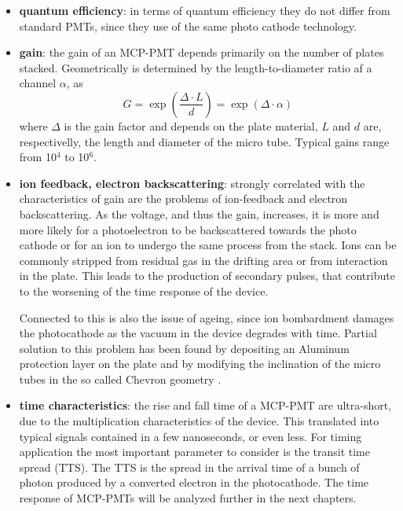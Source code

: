 \begin{itemize}
\item \textbf{quantum efficiency}: in terms of quantum efficiency they do not differ from standard PMTs, since they use of the same photo cathode technology.
\item \textbf{gain}: the gain of an MCP-PMT depends primarily on the number of plates stacked. Geometrically is determined by the length-to-diameter ratio af a channel $\alpha$, as
\begin{equation}
G = \exp{\left( \frac{\Delta \cdot L}{d} \right)} = \exp{\left( \Delta \cdot \alpha \right)}
\end{equation}
where $\Delta$ is the gain factor and depends on the plate material, $L$ and $d$ are, respectivelly, the length and diameter of the micro tube.
Typical gains range from 10$^{4}$ to 10$^{6}$.
\item \textbf{ion feedback, electron backscattering}: strongly correlated with the characteristics of gain are the problems of ion-feedback and electron backscattering. As the voltage, and thus the gain, increases, it is more and more likely for a photoelectron to be backscattered towards the photo cathode or for an ion to undergo the same process from the stack. Ions can be commonly stripped from residual gas in the drifting area or from interaction in the plate.
This leads to the production of secondary pulses, that contribute to the worsening of the time response of the device.

Connected to this is also the issue of ageing, since ion bombardment damages the photocathode as the vacuum in the device degrades with time.
Partial solution to this problem has been found by depositing an Aluminum protection layer on the plate and by modifying the inclination of the micro tubes in the so called Chevron geometry \cite{Vavra2004}.

\item \textbf{time characteristics}: the rise and fall time of a MCP-PMT are ultra-short, due to the multiplication characteristics of the device. This translated into typical signals contained in a few nanoseconds, or even less. For timing application the most important parameter to consider is the transit time spread (TTS). The TTS is the spread in the arrival time of a bunch of photon produced by a converted electron in the photocathode. The time response of MCP-PMTs will be analyzed further in the next chapters.

\end{itemize}

